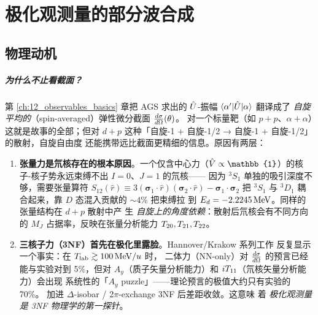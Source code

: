 
\chapter{极化观测量的部分波合成}
\label{ch:13_polarization_observables}

\section{物理动机}
\label{sec:ch13-motivation}

\paragraph{为什么不止看截面？}
第 \ref{ch:12_observables_basics} 章把 AGS 求出的 \(\hat{U}\)-振幅
\(\langle\alpha'|\hat{U}|\alpha\rangle\) 翻译成了
\emph{自旋平均的}（spin-averaged）弹性微分截面 \(\frac{d\sigma}{d\Omega}(\theta)\)。
对一个标量靶（如 \(p+p\)、\(\alpha+\alpha\)）这就是故事的全部；但对
\(d+p\) 这种「自旋-1 + 自旋-1/2 → 自旋-1 + 自旋-1/2」的散射，自旋自由度
还能携带远比截面更精细的信息。原因有两层：

\begin{enumerate}
  \item \textbf{张量力是氘核存在的根本原因}。一个仅含中心力（\(\Vop \propto
        \mathbb{1}\)）的核子-核子势永远束缚不出 \(I=0\)、\(J=1\) 的氘核——
        因为 \({}^3S_1\) 单独的吸引深度不够，需要张量算符
        \(S_{12}(\hat{r}) \equiv 3(\bm{\sigma}_1\cdot\hat{r})(\bm{\sigma}_2\cdot\hat{r})
        - \bm{\sigma}_1\cdot\bm{\sigma}_2\) 把 \({}^3S_1\) 与
        \({}^3D_1\) 耦合起来，靠 \(D\) 态混入贡献的 \(\sim 4\%\) 把束缚拉
        到 \(E_d = -2.2245\,\text{MeV}\)。同样的张量结构在 \(d+p\) 散射中产
        生 \emph{自旋上的角度依赖}：散射后氘核会有不同方向的
        \(M_J\) 占据率，反映在张量分析能力 \({T_{20}}, {T_{21}},
        {T_{22}}\)。
  \item \textbf{三核子力（3NF）首先在极化里露脸}。Hannover/Krakow 系列工作
        \cite{Witala2008} 反复显示一个事实：在 \({T_{\text{lab}}} \gtrsim 100\,\text{MeV}/u\) 时，
        二体力（NN-only）对 \(\frac{d\sigma}{d\Omega}\) 的预言已经能与实验对到 5\%，但对
        \(A_y\)（质子矢量分析能力）和 \({i T_{11}}\)（氘核矢量分析能力）会出现
        系统性的「\(A_y\) puzzle」——理论预言的极值大约只有实验的 70\%。
        加进 \(\Delta\)-isobar / 2\(\pi\)-exchange 3NF 后差距收敛。这意味
        着 \emph{极化观测量是 3NF 物理学的第一探针}。
\end{enumerate}

